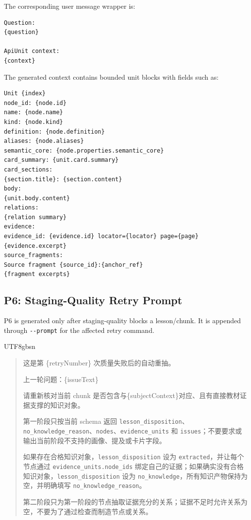 \documentclass[11pt,letterpaper]{article}
\newcommand{\code}[1]{\nolinkurl{#1}}
\newenvironment{prompttranscript}{%
\begin{CJK}{UTF8}{gbsn}%
\begin{quote}%
\small%
\sloppy%
\setlength{\parskip}{0.35em}%
\setlength{\parindent}{0pt}%
}{%
\end{quote}%
\end{CJK}%
}
\newenvironment{prompttranscript}{%
\begin{quote}%
\small%
\sloppy%
\setlength{\parskip}{0.35em}%
\setlength{\parindent}{0pt}%
}{%
\end{quote}%
}
\begin{document}
The corresponding user message wrapper is:

\begin{lstlisting}
Question:
{question}

ApiUnit context:
{context}
\end{lstlisting}

The generated context contains bounded unit blocks with fields such as:

\begin{lstlisting}
Unit {index}
node_id: {node.id}
name: {node.name}
kind: {node.kind}
definition: {node.definition}
aliases: {node.aliases}
semantic_core: {node.properties.semantic_core}
card_summary: {unit.card.summary}
card_sections:
{section.title}: {section.content}
body:
{unit.body.content}
relations:
{relation summary}
evidence:
evidence_id: {evidence.id} locator={locator} page={page}
{evidence.excerpt}
source_fragments:
Source fragment {source_id}:{anchor_ref}
{fragment excerpts}
\end{lstlisting}

\subsection{P6: Staging-Quality Retry Prompt}

P6 is generated only after staging-quality blocks a lesson/chunk. It is appended through \code{--prompt} for the affected retry command.

\begin{prompttranscript}
这是第 \{retryNumber\} 次质量失败后的自动重抽。\par
上一轮问题：\{issueText\}\par
请重新核对当前 chunk 是否包含与\{subjectContext\}对应、且有直接教材证据支撑的知识对象。\par
第一阶段只按当前 schema 返回 \code{lesson\_disposition}、\code{no\_knowledge\_reason}、\code{nodes}、\code{evidence\_units} 和 \code{issues}；不要要求或输出当前阶段不支持的画像、提及或卡片字段。\par
如果存在合格知识对象，\code{lesson\_disposition} 设为 \code{extracted}，并让每个节点通过 \code{evidence\_units.node\_ids} 绑定自己的证据；如果确实没有合格知识对象，\code{lesson\_disposition} 设为 \code{no\_knowledge}，所有知识产物保持为空，并明确填写 \code{no\_knowledge\_reason}。\par
第二阶段只为第一阶段的节点抽取证据充分的关系；证据不足时允许关系为空，不要为了通过检查而制造节点或关系。
\end{prompttranscript}
\end{document}
